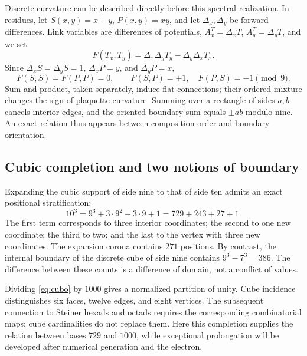 

Discrete curvature can be described directly before this spectral realization. In residues, let \(S(x,y)=x+y\), \(P(x,y)=xy\), and let \(\Delta_x,\Delta_y\) be forward differences. Link variables are differences of potentials, \(A_x^T=\Delta_xT\), \(A_y^T=\Delta_yT\), and we set
\[
 F(T_x,T_y)=\Delta_x\Delta_yT_y-\Delta_y\Delta_xT_x.
\]
Since \(\Delta_xS=\Delta_yS=1\), \(\Delta_xP=y\), and \(\Delta_yP=x\),
\begin{equation}
 F(S,S)=F(P,P)=0,\qquad F(S,P)=+1,\quad F(P,S)=-1\pmod9.
\end{equation}
Sum and product, taken separately, induce flat connections; their ordered mixture changes the sign of plaquette curvature. Summing over a rectangle of sides \(a,b\) cancels interior edges, and the oriented boundary sum equals \(\pm ab\) modulo nine. An exact relation thus appears between composition order and boundary orientation.

\subsection{Cubic completion and two notions of boundary}


Expanding the cubic support of side nine to that of side ten admits an exact positional stratification:
\begin{equation}
 10^3=9^3+3\cdot9^2+3\cdot9+1=729+243+27+1.
 \label{eq:cubo}
\end{equation}
The first term corresponds to three interior coordinates; the second to one new coordinate; the third to two; and the last to the vertex with three new coordinates. The expansion corona contains \(271\) positions. By contrast, the internal boundary of the discrete cube of side nine contains \(9^3-7^3=386\). The difference between these counts is a difference of domain, not a conflict of values.

Dividing \eqref{eq:cubo} by \(1000\) gives a normalized partition of unity. Cube incidence distinguishes six faces, twelve edges, and eight vertices. The subsequent connection to Steiner hexads and octads requires the corresponding combinatorial maps; cube cardinalities do not replace them. Here this completion supplies the relation between bases \(729\) and \(1000\), while exceptional prolongation will be developed after numerical generation and the electron.





